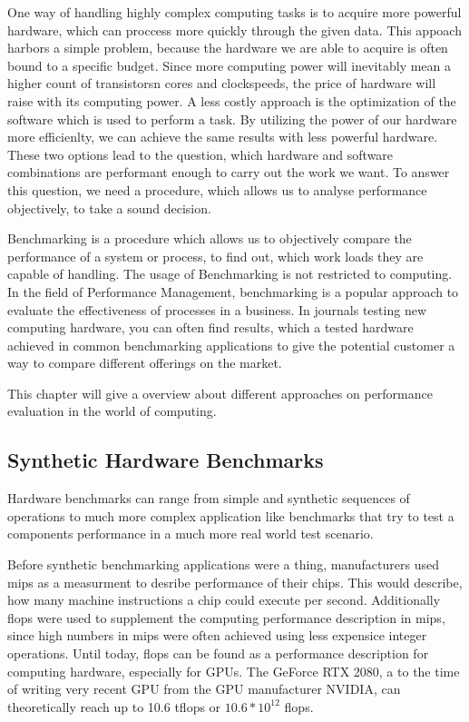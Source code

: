 One way of handling highly complex computing tasks is to acquire more powerful hardware, which can proccess more quickly through the given data. This appoach harbors a simple problem, because the hardware we are able to acquire is often bound to a specific budget. Since more computing power will inevitably mean a higher count of transistorsn cores and clockspeeds, the price of hardware will raise with its computing power. A less costly approach is the optimization of the software which is used to perform a task. By utilizing the power of our hardware more efficienlty, we can achieve the same results with less powerful hardware. These two options lead to the question, which hardware and software combinations are performant enough to carry out the work we want. To answer this question, we need a procedure, which allows us to analyse performance objectively, to take a sound decision.
\cite{mooresLaw}

Benchmarking is a procedure which allows us to objectively compare the performance of a system or process, to find out, which work loads they are capable of handling. The usage of Benchmarking is not restricted to computing. In the field of Performance Management, benchmarking is a popular approach to evaluate the effectiveness of processes in a business. In journals testing new computing hardware, you can often find results, which a tested hardware achieved in common benchmarking applications to give the potential customer a way to compare different offerings on the market.
\cite{BenchmPerfManagement}

This chapter will give a overview about different approaches on performance evaluation in the world of computing.





\subsection{Synthetic Hardware Benchmarks}

Hardware benchmarks can range from simple and synthetic sequences of operations to much more complex application like benchmarks that try to test a components performance in a much more real world test scenario.

Before synthetic benchmarking applications were a thing, manufacturers used \gls{mips} as a measurment to desribe performance of their chips. This would describe, how many machine instructions a chip could execute per second. Additionally \gls{flops} were used to supplement the computing performance description in \gls{mips}, since high numbers in \gls{mips} were often achieved using less expensice integer operations. Until today, \gls{flops} can be found as a performance description for computing hardware, especially for GPUs. The GeForce RTX 2080, a to the time of writing very recent GPU from the GPU manufacturer NVIDIA, can theoretically reach up to 10.6 \gls{tflops} or $10.6 * 10^{12}$ \gls{flops}.
\cite{heiseGtx2080}

